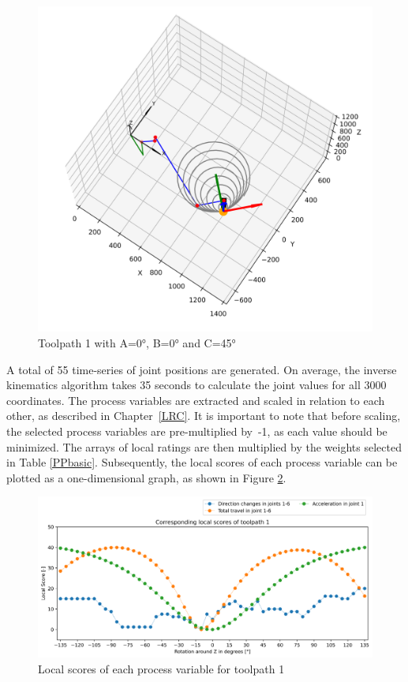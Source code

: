 \begin{figure}[H]
\begin{minipage}{0.5\textwidth}
		\includegraphics[width=\textwidth]{figures/robotANDpath1_45.png}
		\caption{Toolpath 1 with A=0°, B=0° and C=45°}
		\label{TP1+25}
	\end{minipage}\par
\end{figure}

A total of 55 time-series of joint positions are generated. On average, the inverse kinematics algorithm takes 35 seconds to calculate the joint values for all 3000 coordinates. The process variables are extracted and scaled in relation to each other, as described in Chapter~\ref{LRC}. It is important to note that before scaling, the selected process variables are pre-multiplied by~-1, as each value should be minimized. The arrays of local ratings are then multiplied by the weights selected in Table \ref{PPbasic}. Subsequently, the local scores of each process variable can be plotted as a one-dimensional graph, as shown in Figure \ref{LS1}.

\begin{figure}[H]
	\centerline{\includegraphics[width=1\textwidth]{figures/LocalScores_1.png}}
	\caption{Local scores of each process variable for toolpath 1}
	\label{LS1}
\end{figure}


